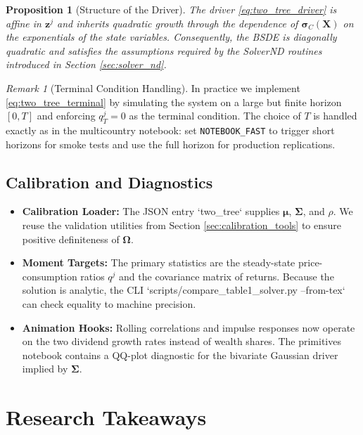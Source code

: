 \documentclass[11pt,letterpaper,oneside]{article}
\theoremstyle{plain}
\newtheorem{proposition}[theorem]{Proposition}
\theoremstyle{definition}
\theoremstyle{remark}
\newtheorem{remark}{Remark}[section]
\begin{document}
\begin{proposition}[Structure of the Driver]
\label{prop:two_tree_driver_structure}
The driver \eqref{eq:two_tree_driver} is affine in $\bm{z}^j$ and inherits quadratic growth through the dependence of $\bm{\sigma}_C(\bm{X})$ on the exponentials of the state variables. Consequently, the BSDE is diagonally quadratic and satisfies the assumptions required by the SolverND routines introduced in Section \ref{sec:solver_nd}.
\end{proposition}

\begin{remark}[Terminal Condition Handling]
In practice we implement \eqref{eq:two_tree_terminal} by simulating the system on a large but finite horizon $[0,T]$ and enforcing $q^j_T = 0$ as the terminal condition. The choice of $T$ is handled exactly as in the multicountry notebook: set \texttt{NOTEBOOK_FAST} to trigger short horizons for smoke tests and use the full horizon for production replications.
\end{remark}

\subsection{Calibration and Diagnostics}

\begin{itemize}[leftmargin=1.2em]
  \item \textbf{Calibration Loader:} The JSON entry `two_tree` supplies $\bm{\mu}$, $\bm{\Sigma}$, and $\rho$. We reuse the validation utilities from Section \ref{sec:calibration_tools} to ensure positive definiteness of $\bm{\Omega}$.
  \item \textbf{Moment Targets:} The primary statistics are the steady-state price-consumption ratios $q^j$ and the covariance matrix of returns. Because the solution is analytic, the CLI `scripts/compare_table1_solver.py --from-tex` can check equality to machine precision.
  \item \textbf{Animation Hooks:} Rolling correlations and impulse responses now operate on the two dividend growth rates instead of wealth shares. The primitives notebook contains a QQ-plot diagnostic for the bivariate Gaussian driver implied by $\bm{\Sigma}$.
\end{itemize}

\section{Research Takeaways}
\label{sec:two_tree_takeaways}
\end{document}
